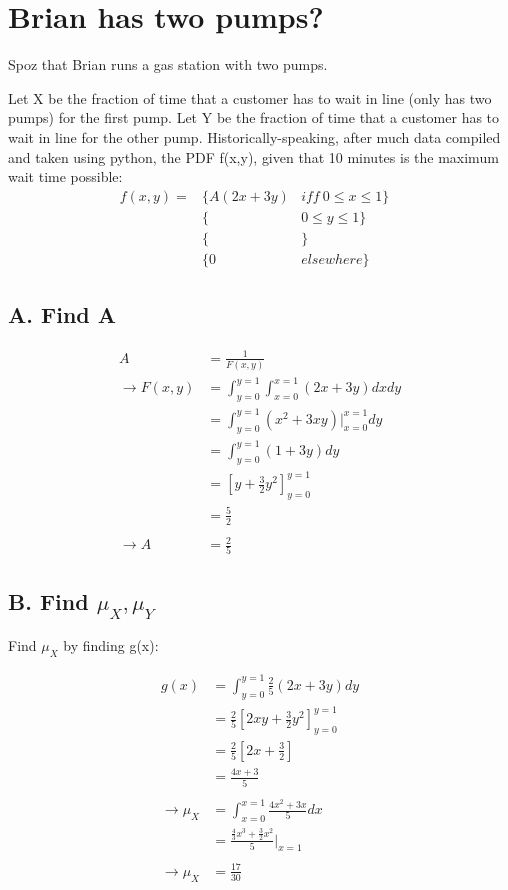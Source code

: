 \documentclass[]{article}
\begin{document}
		\pagebreak
		\section{Brian has two pumps?}
		
		Spoz that Brian runs a gas station with two pumps.
		
		Let X be the fraction of time that a customer has to wait in line (only has two pumps) for the first pump. Let Y be the fraction of time that a customer has to wait in line for the other pump. Historically-speaking, after much data compiled and taken using python, the PDF f(x,y), given that 10 minutes is the maximum wait time possible:
		\begin{align*}
			f(x,y) = &\{A(2x + 3y)  &iff\   0\leq x\leq 1\}& \\
			         &\{            &       0\leq y\leq 1\}& \\
			         &\{            &                    \}& \\
			         &\{0           &       elsewhere    \}&
		\end{align*}
		
		\subsection{A. Find A}
			\begin{align*}
				A      &= \frac{1}{F(x,y)} \\
			\to F(x,y) &= \int_{y=0}^{y=1}\int_{x=0}^{x=1}(2x+3y)dxdy \\
			           &= \int_{y=0}^{y=1}(x^2 + 3xy)|_{x=0}^{x=1}dy \\
			           &= \int_{y=0}^{y=1}(1 + 3y)dy \\
			           &= [y + \frac{3}{2}y^2]_{y=0}^{y=1} \\
			           &= \frac{5}{2} \\
			           \\
			\to A      &= \frac{2}{5}
			\end{align*}
		
		\pagebreak
		\subsection{B. Find $\mu_X, \mu_Y$}
		Find $\mu_X$ by finding g(x):
		
		\begin{align*}
			g(x)  &= \int_{y=0}^{y=1}\frac{2}{5}(2x+3y)dy \\
			      &= \frac{2}{5}[2xy + \frac{3}{2}y^2]_{y=0}^{y=1} \\
			      &= \frac{2}{5}[2x + \frac{3}{2}] \\
			      &= \frac{4x + 3}{5} \\\\
		\to \mu_X &= \int_{x=0}^{x=1}\frac{4x^2+3x}{5}dx \\
		          &= \frac{\frac{4}{3}x^3 + \frac{3}{2}x^2}{5}|_{x=1} \\\\
		\to \mu_X &= \frac{17}{30}
		\end{align*}
		
\end{document}
